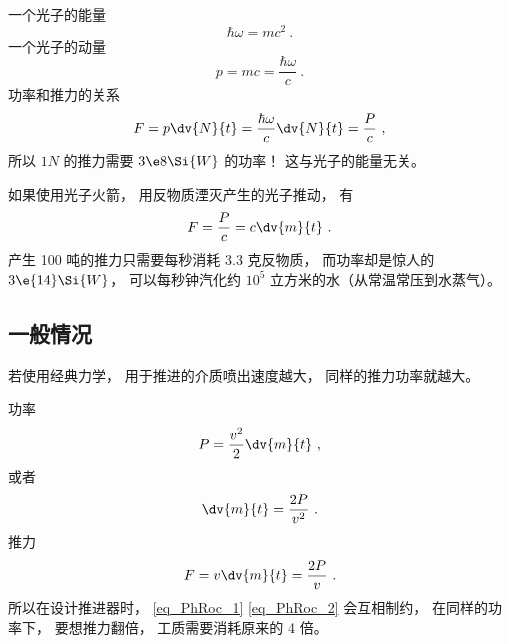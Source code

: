 
\begin{issues}
\issueDraft
\end{issues}

一个光子的能量
\begin{equation}
\hbar\omega = mc^2~.
\end{equation}
一个光子的动量
\begin{equation}
p = mc = \frac{\hbar\omega}{c}~.
\end{equation}
功率和推力的关系
\begin{equation}
F = p \dv{N}{t} = \frac{\hbar\omega}{c}\dv{N}{t} = \frac{P}{c}~,
\end{equation}
所以 $1N$ 的推力需要 $3\e8\Si{W}$ 的功率！ 这与光子的能量无关。

如果使用光子火箭， 用反物质湮灭产生的光子推动， 有
\begin{equation}
F = \frac{P}{c} = c\dv{m}{t}~.
\end{equation}
产生 100 吨的推力只需要每秒消耗 3.3 克反物质， 而功率却是惊人的 $3\e{14}\Si{W}$， 可以每秒钟汽化约 $10^5$ 立方米的水（从常温常压到水蒸气）。

\subsection{一般情况}
若使用经典力学， 用于推进的介质喷出速度越大， 同样的推力功率就越大。

功率
\begin{equation}
P = \frac{v^2}{2}\dv{m}{t}~,
\end{equation}
或者
\begin{equation}\label{eq_PhRoc_1}
\dv{m}{t} = \frac{2P}{v^2}~.
\end{equation}
推力
\begin{equation}\label{eq_PhRoc_2}
F = v\dv{m}{t} = \frac{2P}{v}~.
\end{equation}
所以在设计推进器时， \autoref{eq_PhRoc_1} \autoref{eq_PhRoc_2} 会互相制约， 在同样的功率下， 要想推力翻倍， 工质需要消耗原来的 4 倍。

